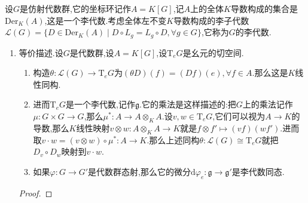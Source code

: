 设$G$是仿射代数群,它的坐标环记作$A=K[G]$,记$A$上的全体$K$导数构成的集合是$\mathrm{Der}_K(A)$,这是一个李代数.考虑全体左不变$K$导数构成的李子代数$\mathscr{L}(G)=\{D\in\mathrm{Der}_K(A)\mid D\circ L_g=L_g\circ D,\forall g\in G\}$,它称为$G$的李代数.
\begin{enumerate}
	\item 等价描述.设$G$是代数群,设$A=K[G]$,设$\mathrm{T}_eG$是幺元的切空间.
	\begin{enumerate}[(1)]
		\item 构造$\theta:\mathscr{L}(G)\to\mathrm{T}_eG$为$(\theta D)(f)=(Df)(e),\forall f\in A$.那么这是$K$线性同构.
		\item 进而$\mathrm{T}_eG$是一个李代数,记作$\mathfrak{g}$.它的乘法是这样描述的:把$G$上的乘法记作$\mu:G\times G\to G$,那么$\mu^*:A\to A\otimes_KA$.设$v,w\in\mathrm{T}_eG$,它们可以视为$A\to K$的导数,那么$K$线性映射$v\otimes w:A\otimes_KA\to K$就是$f\otimes f'\mapsto(vf)(wf')$.进而取$v\cdot w=(v\otimes w)\circ\mu^*:A\to K$.那么上述同构$\theta:\mathscr{L}(G)\cong\mathrm{T}_eG$就把$D_v\circ D_w$映射到$v\cdot w$.
		\item 如果$\varphi:G\to G'$是代数群态射,那么它的微分$\mathrm{d}\varphi_e:\mathfrak{g}\to\mathfrak{g}'$是李代数同态.
	\end{enumerate}
	\begin{proof}
		

\end{proof}
\end{enumerate}
